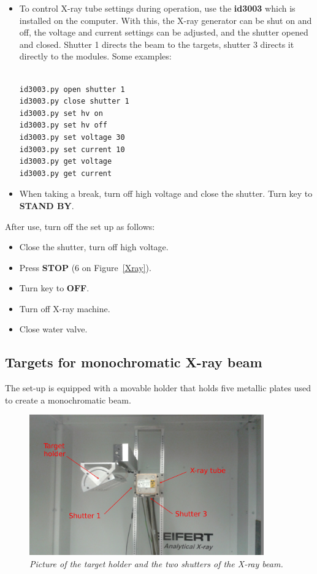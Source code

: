 \documentclass[a4paper,12pt,twoside]{article}
\begin{document}
\begin{itemize}
\item {To control X-ray tube settings during operation, use the \textbf{id3003} which is installed on the computer. With this, the X-ray generator can be shut on and off, the voltage and current settings can be adjusted, and the shutter opened and closed. Shutter 1 directs the beam to the targets, shutter 3 directs it directly to the modules. Some examples:
\\
\\
\begin{Verbatim}[frame=single]
id3003.py open shutter 1
id3003.py close shutter 1
id3003.py set hv on
id3003.py set hv off
id3003.py set voltage 30
id3003.py set current 10
id3003.py get voltage
id3003.py get current
\end{Verbatim}
}
\item{When taking a break, turn off high voltage and close the shutter. Turn key to \textbf{STAND BY}.}
\end{itemize}
After use, turn off the set up as follows:
\begin{itemize}
\item {Close the shutter, turn off high voltage.}
\item {Press \textbf{STOP} (6 on Figure~\ref{Xray}).}
\item {Turn key to \textbf{OFF}.}
\item {Turn off X-ray machine.}
\item {Close water valve.}
\end{itemize}
\subsection{Targets for monochromatic X-ray beam}

The set-up is equipped with a movable holder that holds five metallic plates used to create a monochromatic beam. 

\begin{figure} [h!] \centering 
\includegraphics[width=0.9\textwidth, angle=0] {./Figures/Targets.jpg}
\caption{\em  \label{Targets}
Picture of the target holder and the two shutters of the X-ray beam.}
\end{figure}
\end{document}
